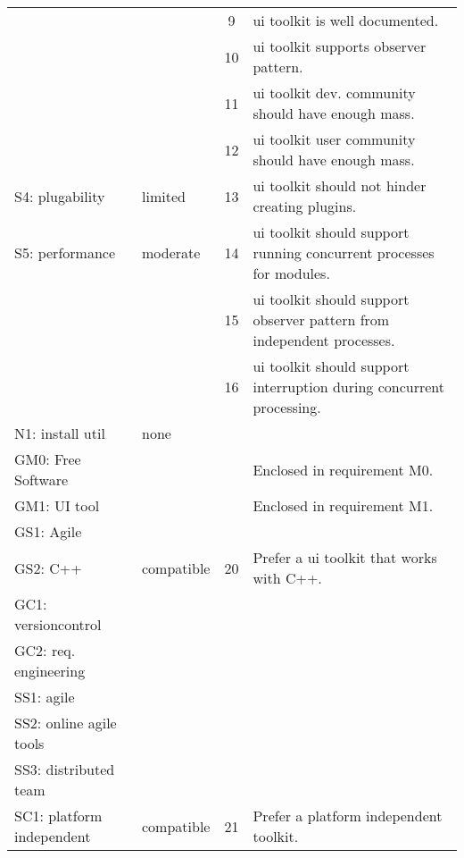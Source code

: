 \begin{center}
\begin{longtable}{ll||cp{13em}}
	                         &              &  9  & ui toolkit is well documented.\\
	                         &              & 10  & ui toolkit supports observer pattern.\\
	                         &              & 11  & ui toolkit dev. community should have enough mass.\\
	                         &              & 12  & ui toolkit user community should have enough mass.\\
        S4: plugability      & limited      & 13  & ui toolkit should not hinder creating plugins.\\
        S5: performance	     & moderate     & 14  & ui toolkit should support running concurrent processes for modules.\\
	                         &              & 15  & ui toolkit should support observer pattern from independent processes.\\
	                         &              & 16  & ui toolkit should support interruption during concurrent processing.\\
        N1: install util     & none    		&     & \\\hline
		GM0: Free Software  &              &     & Enclosed in requirement M0.\\
        GM1: UI tool	    &              &     & Enclosed in requirement M1.\\
        GS1: Agile	        &              &     & \\
        GS2: C++	        & compatible   & 20  & Prefer a ui toolkit that works with C++.\\
        GC1: versioncontrol &              &     & \\
        GC2: req. engineering
						    &              &     & \\\hline
        SS1: agile	        &              &     & \\
        SS2: online agile tools
							&              &     & \\
        SS3: distributed team
							&              &     & \\
        SC1: platform independent
							& compatible   & 21  & Prefer a platform independent toolkit.\\
    \end{longtable}
    \label{tab:uitool-requirements}
\end{center}
